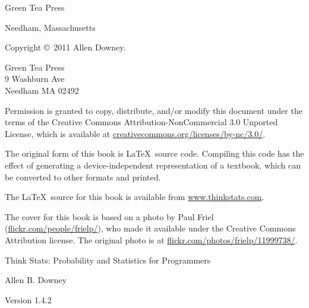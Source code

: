 \documentclass[12pt]{book}
\newcommand{\thetitle}{Think Stats: Probability and Statistics for Programmers}
\newcommand{\theversion}{1.4.2}
\begin{document}
\begin{latexonly}
\begin{flushright}
\vspace{0.5in}

{\Large Green Tea Press}

{\small Needham, Massachusetts}

\vfill

\end{flushright}


\pagebreak
\thispagestyle{empty}

{\small
Copyright \copyright ~2011 Allen Downey.


\vspace{0.2in}

\begin{flushleft}
Green Tea Press       \\
9 Washburn Ave \\
Needham MA 02492
\end{flushleft}

Permission is granted to copy, distribute, and/or modify this document
under the terms of the Creative Commons Attribution-NonCommercial 3.0 Unported
License, which is available at \url{creativecommons.org/licenses/by-nc/3.0/}.

The original form of this book is \LaTeX\ source code.  Compiling this
code has the effect of generating a device-independent representation
of a textbook, which can be converted to other formats and printed.

The \LaTeX\ source for this book is available from
\url{www.thinkstats.com}.

The cover for this book is based on a photo by Paul Friel
(\url{flickr.com/people/frielp/}), who made it available under
the Creative Commons Attribution license.  The original photo
is at \url{flickr.com/photos/frielp/11999738/}.

\vspace{0.2in}

} %

\end{latexonly}



\begin{htmlonly}


{\Large \thetitle}

{\large Allen B. Downey}

Version \theversion

\setcounter{chapter}{-1}

\end{htmlonly}
\end{document}

